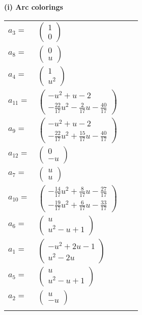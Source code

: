 \documentclass[1p]{elsarticle_modified}
\theoremstyle{definition}
\begin{document}
\flushleft \textbf{(i) Arc colorings}\\
\begin{tabular}{m{7pt} m{180pt} m{7pt} m{180pt} }
\flushright $a_{3}=$&$\begin{pmatrix}1\\0\end{pmatrix}$ \\
\flushright $a_{8}=$&$\begin{pmatrix}0\\u\end{pmatrix}$ \\
\flushright $a_{4}=$&$\begin{pmatrix}1\\u^2\end{pmatrix}$ \\
\flushright $a_{11}=$&$\begin{pmatrix}- u^2+u-2\\-\frac{22}{17} u^2-\frac{2}{17} u-\frac{40}{17}\end{pmatrix}$ \\
\flushright $a_{9}=$&$\begin{pmatrix}- u^2+u-2\\-\frac{22}{17} u^2+\frac{15}{17} u-\frac{40}{17}\end{pmatrix}$ \\
\flushright $a_{12}=$&$\begin{pmatrix}0\\- u\end{pmatrix}$ \\
\flushright $a_{7}=$&$\begin{pmatrix}u\\u\end{pmatrix}$ \\
\flushright $a_{10}=$&$\begin{pmatrix}-\frac{14}{17} u^2+\frac{8}{17} u-\frac{27}{17}\\-\frac{19}{17} u^2+\frac{6}{17} u-\frac{33}{17}\end{pmatrix}$ \\
\flushright $a_{6}=$&$\begin{pmatrix}u\\u^2- u+1\end{pmatrix}$ \\
\flushright $a_{1}=$&$\begin{pmatrix}- u^2+2 u-1\\u^2-2 u\end{pmatrix}$ \\
\flushright $a_{5}=$&$\begin{pmatrix}u\\u^2- u+1\end{pmatrix}$ \\
\flushright $a_{2}=$&$\begin{pmatrix}u\\- u\end{pmatrix}$\\&\end{tabular}
\end{document}

